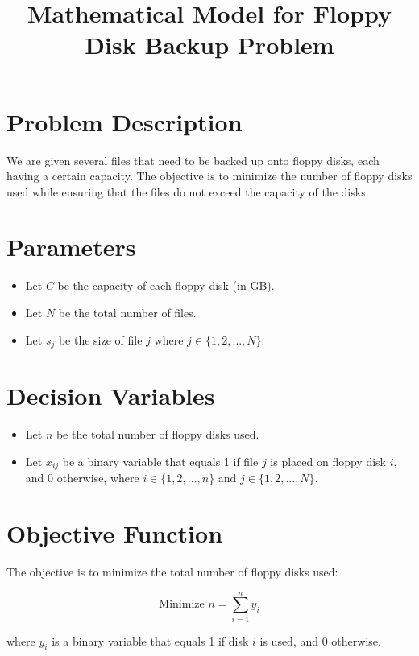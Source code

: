 \documentclass{article}
\begin{document}
\title{Mathematical Model for Floppy Disk Backup Problem}
\author{}
\date{}
\maketitle

\section*{Problem Description}
We are given several files that need to be backed up onto floppy disks, each having a certain capacity. The objective is to minimize the number of floppy disks used while ensuring that the files do not exceed the capacity of the disks.

\section*{Parameters}
\begin{itemize}
    \item Let \( C \) be the capacity of each floppy disk (in GB).
    \item Let \( N \) be the total number of files.
    \item Let \( s_j \) be the size of file \( j \) where \( j \in \{1, 2, \ldots, N\} \).
\end{itemize}

\section*{Decision Variables}
\begin{itemize}
    \item Let \( n \) be the total number of floppy disks used.
    \item Let \( x_{ij} \) be a binary variable that equals 1 if file \( j \) is placed on floppy disk \( i \), and 0 otherwise, where \( i \in \{1, 2, \ldots, n\} \) and \( j \in \{1, 2, \ldots, N\} \).
\end{itemize}

\section*{Objective Function}
The objective is to minimize the total number of floppy disks used:

\[
\text{Minimize } n = \sum_{i=1}^{n} y_i
\]

where \( y_i \) is a binary variable that equals 1 if disk \( i \) is used, and 0 otherwise.
\end{document}
